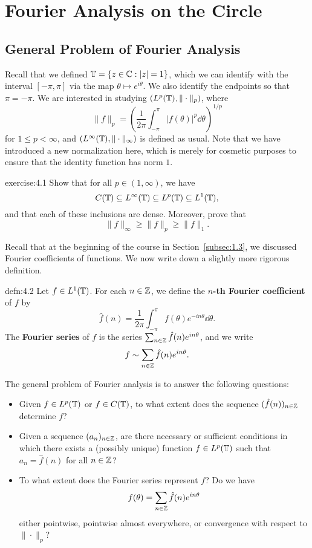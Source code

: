 \section{Fourier Analysis on the Circle} \label{sec:4}

\subsection{General Problem of Fourier Analysis} \label{subsec:4.1}
Recall that we defined $\mathbb{T} = \{z \in \mathbb{C} : |z| = 1\}$, which we can 
identify with the interval $[-\pi, \pi]$ via the map $\theta \mapsto 
e^{i\theta}$. We also identify the endpoints so that $\pi = -\pi$. 
We are interested in studying $(L^p(\mathbb{T}), \|\cdot\|_p)$, where
\[ \|f\|_p = \left( \frac{1}{2\pi} \int_{-\pi}^\pi |f(\theta)|^p \dd\theta 
\right)^{\!1/p} \]
for $1 \leq p < \infty$, and $(L^\infty(\mathbb{T}), \|\cdot\|_\infty)$ is defined 
as usual. Note that we have introduced a new normalization here, which is 
merely for cosmetic purposes to ensure that the identity function 
has norm $1$. 

\begin{exercise}{exercise:4.1}
    Show that for all $p \in (1, \infty)$, we have 
    \[ C(\mathbb{T}) \subseteq L^\infty(\mathbb{T}) \subseteq L^p(\mathbb{T}) \subseteq L^1(\mathbb{T}), \] 
    and that each of these inclusions are dense. Moreover, prove that 
    \[ \|f\|_\infty \geq \|f\|_p \geq \|f\|_1. \]  
\end{exercise}

Recall that at the beginning of the course in Section~\ref{subsec:1.3}, we 
discussed Fourier coefficients of functions. We now write down a slightly more 
rigorous definition.

\begin{defn}{defn:4.2}
    Let $f \in L^1(\mathbb{T})$. For each $n \in \mathbb{Z}$, we define the {\bf $n$-th 
    Fourier coefficient} of $f$ by 
    \[ \hat f(n) = \frac1{2\pi} \int_{-\pi}^\pi f(\theta) e^{-in\theta} \dd\theta. \] 
    The {\bf Fourier series} of $f$ is the series $\sum_{n\in\mathbb{Z}} \hat f(n) 
    e^{in\theta}$, and we write 
    \[ f \sim \sum_{n\in\mathbb{Z}} \hat f(n) e^{in\theta}. \] 
\end{defn}

The general problem of Fourier analysis is to answer the following questions: 
\begin{itemize}
    \item Given $f \in L^p(\mathbb{T})$ or $f \in C(\mathbb{T})$, to what extent does the 
    sequence $(\hat f(n))_{n\in\mathbb{Z}}$ determine $f$? 
    \item Given a sequence $(a_n)_{n\in\mathbb{Z}}$, are there necessary or sufficient 
    conditions in which there exists a (possibly unique) function $f \in 
    L^p(\mathbb{T})$ such that $a_n = \hat f(n)$ for all $n \in \mathbb{Z}$? 
    \item To what extent does the Fourier series represent $f$? Do we have 
    \[ f(\theta) = \sum_{n\in\mathbb{Z}} \hat f(n) e^{in\theta} \] 
    either pointwise, pointwise almost everywhere, or convergence with 
    respect to $\|\cdot\|_p$? 
\end{itemize}


